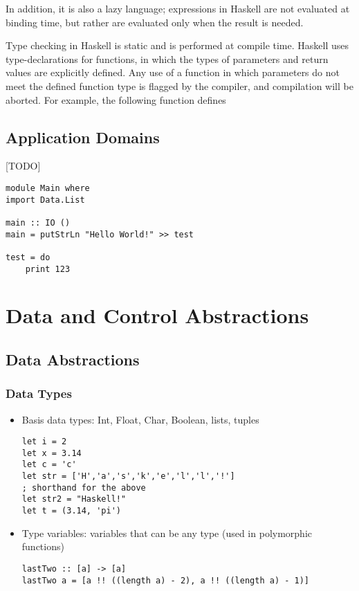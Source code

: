 \documentclass[titlepage,12pt]{article}
\newcommand{\bi}{\begin{itemize}}
\newcommand{\ei}{\end{itemize}}
\begin{document}
In addition, it is also a lazy language; expressions in Haskell are not evaluated at binding time, but rather are evaluated only when the result is needed. 

Type checking in Haskell is static and is performed at compile time. Haskell uses type-declarations for functions, in which the types of parameters and return values are explicitly defined. Any use of a function in which parameters do not meet the defined function type is flagged by the compiler, and compilation will be aborted. For example, the following function defines 

\subsection{Application Domains}



[TODO]~\cite{learnyouahaskell}
\begin{verbatim}
module Main where
import Data.List

main :: IO ()
main = putStrLn "Hello World!" >> test

test = do 
    print 123
\end{verbatim}

\section{Data and Control Abstractions}


\subsection{Data Abstractions}
\subsubsection{Data Types}
\bi
    \item Basis data types: Int, Float, Char, Boolean, lists, tuples
\begin{verbatim}
let i = 2
let x = 3.14
let c = 'c'
let str = ['H','a','s','k','e','l','l','!']
; shorthand for the above
let str2 = "Haskell!"
let t = (3.14, 'pi')
\end{verbatim}

    \item Type variables: variables that can be any type (used in polymorphic functions)
\begin{verbatim}
lastTwo :: [a] -> [a]
lastTwo a = [a !! ((length a) - 2), a !! ((length a) - 1)]
\end{verbatim}
\ei
\end{document}
